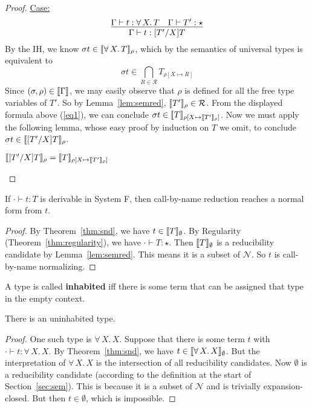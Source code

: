 \documentclass{article}
\begin{document}
\begin{proof}
\underline{Case:}
\[
\infer{\Gamma \vdash t : [T'/X]T}{\Gamma \vdash t : \forall\, X.\,T & \Gamma \vdash T' : \star} 
\]
By the IH, we know $\sigma t\in\llbracket \forall\, X.\,T \rrbracket_\rho$, which by the semantics
of universal types is equivalent to
\begin{equation}
\label{eq1}
\sigma t \in \bigcap_{R\in\mathcal{R}} T_{\rho[X\mapsto R]}
\end{equation}
Since $(\sigma,\rho)\in\llbracket \Gamma \rrbracket$, we may easily observe that
$\rho$ is defined for all the free type variables of $T'$.  So by
Lemma~\ref{lem:semred}, $\llbracket T' \rrbracket_\rho\in\mathcal{R}$.  From the
displayed formula above (\ref{eq1}), we can conclude $\sigma t\in
\llbracket T \rrbracket_{\rho[X\mapsto \llbracket T' \rrbracket_\rho]}$.  Now we must apply the
following lemma, whose easy proof by induction on $T$ we omit, to
conclude $\sigma t\in\llbracket [T'/X]T \rrbracket_\rho$.
\begin{lemma}
$\llbracket [T'/X]T \rrbracket_\rho = \llbracket T \rrbracket_{\rho[X\mapsto \llbracket T' \rrbracket_\rho]}$
\end{lemma}
\vspace{-.3cm}
\end{proof}

\begin{corollary}
  If $\cdot\vdash t : T$ is derivable in System F, then call-by-name reduction
  reaches a normal form from $t$.
\end{corollary}
\begin{proof}
  By Theorem~\ref{thm:snd}, we have $t \in \llbracket T \rrbracket_\emptyset$.  By Regularity (Theorem~\ref{thm:regularity}),
  we have $\cdot\vdash T : \star$.  Then $\llbracket T \rrbracket_\emptyset$ is
  a reducibility candidate by Lemma~\ref{lem:semred}.  This means it is a subset of $\mathcal{N}$.  So $t$ is
  call-by-name normalizing.
\end{proof}

A type is called \textbf{inhabited} iff there is some term that can be assigned
that type in the empty context.  

\vspace{0.25cm}
\begin{corollary}
  There is an uninhabited type.
\end{corollary}
\begin{proof}
  One such type is $\forall\,X.\,X$.  Suppose that there is some term $t$ with
  $\cdot\vdash t : \forall\,X.\,X$.  By Theorem~\ref{thm:snd}, we have $t \in \llbracket \forall\,X.\,X \rrbracket_\emptyset$.
  But the interpretation of $\forall\,X.\,X$ is the intersection of all reducibility candidates.
  Now $\emptyset$ is a reducibility candidate (according to the definition at the start of Section~\ref{sec:sem}).
  This is because it is a subset of $\mathcal{N}$ and is trivially expansion-closed.  But then $t\in\emptyset$,
  which is impossible.
  \end{proof}
  
\end{document}

